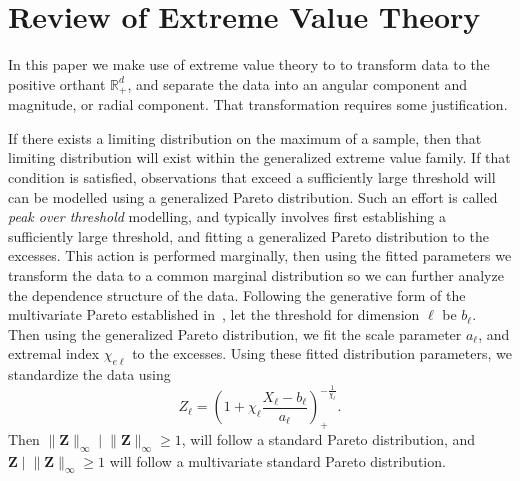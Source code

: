 \section{Review of Extreme Value Theory\label{sec:evt}}
In this paper we make use of extreme value theory to to transform data to 
    the positive orthant $\mathbb{R}_+^d$, and separate the data into an angular
    component and magnitude, or radial component.  That transformation requires
    some justification.

If there exists a limiting distribution on the maximum of a sample, then that limiting 
    distribution will exist within the generalized extreme value family.\cite{weibull1951}
    If that condition is satisfied, observations that exceed a sufficiently large 
    threshold will can be modelled using a generalized Pareto distribution. Such 
    an effort is called \emph{peak over threshold} modelling, and typically 
    involves first establishing a sufficiently large threshold, 
    and fitting a generalized Pareto distribution to the excesses.  This action is performed
    marginally, then using the fitted parameters we transform the data to a common marginal 
    distribution so we can further analyze the dependence structure of the data.  Following 
    the generative form of the multivariate Pareto established in~\cite{ferreira2014},
    let the threshold for dimension $\ell$ be $b_{\ell}$.  Then using the generalized Pareto 
    distribution, we fit the scale parameter $a_{\ell}$, and extremal index $\chi_{e\ell}$ 
    to the excesses.  
    Using these fitted distribution parameters, we standardize the data using
    \[
        Z_{\ell} = \left(1 + \chi_{\ell}\frac{X_{\ell} - b_{\ell}}{a_{\ell}}\right)_{+}^{-\frac{1}{\chi_{\ell}}}.
    \]
    Then $\lVert \bm{Z}\rVert_{\infty}\mid\lVert \bm{Z}\rVert_{\infty} \geq 1$, will follow
    a standard Pareto distribution, and $\bm{Z}\mid \lVert \bm{Z}\rVert_{\infty} \geq 1$ 
    will follow a multivariate standard Pareto distribution.

